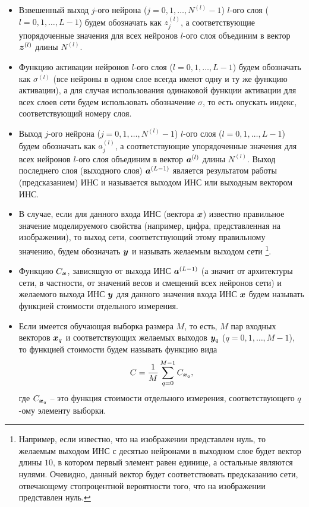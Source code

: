 \documentclass[a4paper,12pt,russian]{article} %
\begin{document}
\begin{itemize}
	\item
		Взвешенный выход $j$-ого нейрона  ($j=0, 1, \ldots, N^{(l)}-1$) $l$-ого слоя  ($l=0, 1, \ldots, L-1$) будем обозначать как $z_j^{(l)}$, а соответствующие упорядоченные значения для всех нейронов $l$-ого слоя объединим в вектор $\bm{z}^{(l)}$ длины $N^{(l)}$.
	\item
		Функцию активации нейронов $l$-ого слоя  ($l=0, 1, \ldots, L-1$) будем обозначать как $\sigma^{(l)}$ (все нейроны в одном слое всегда имеют одну и ту же функцию активации), а для случая использования одинаковой функции активации для всех слоев сети будем использовать обозначение $\sigma$, то есть опускать индекс, соответствующий номеру слоя.
	\item
		Выход $j$-ого нейрона  ($j=0, 1, \ldots, N^{(l)}-1$) $l$-ого слоя  ($l=0, 1, \ldots, L-1$) будем обозначать как $a_j^{(l)}$, а соответствующие упорядоченные значения для всех нейронов $l$-ого слоя объединим в вектор $\bm{a}^{(l)}$ длины $N^{(l)}$.	
		Выход последнего слоя (выходного слоя) $\bm{a}^{(L-1)}$ является результатом работы (предсказанием) ИНС и называется выходом ИНС или выходным вектором ИНС.
	\item
		В случае, если для данного входа ИНС (вектора $\bm{x}$) известно правильное значение моделируемого свойства (например, цифра, представленная на изображении), то выход сети, соответствующий этому правильному значению, будем обозначать $\bm{y}$ и называть желаемым выходом сети \footnote{
		Например, если известно, что на изображении представлен нуль, то желаемым выходом ИНС с десятью нейронами в выходном слое будет вектор длины $10$, в котором первый элемент равен единице, а остальные являются нулями. Очевидно, данный вектор будет соответствовать предсказанию сети, отвечающему стопроцентной вероятности того, что на изображении представлен нуль.
		}.
	\item
		Функцию $C_{\bm{x}}$, зависящую от выхода ИНС $\bm{a}^{(L-1)}$ (а значит от архитектуры сети, в частности, от значений весов и смещений всех нейронов сети) и желаемого выхода ИНС $\bm{y}$ для данного значения входа ИНС $\bm{x}$ будем называть функцией стоимости отдельного измерения.
	\item
		Если имеется обучающая выборка размера $M$, то есть, $M$ пар входных векторов $\bm{x}_q$ и соответствующих желаемых выходов $\bm{y}_q$ ($q=0, 1, \ldots, M-1$), то функцией стоимости будем называть функцию вида
		$$
			C = \frac{1}{M} \sum_{q=0}^{M-1} C_{\bm{x}_q},
		$$
		где $C_{\bm{x}_q}$ -- это функция стоимости отдельного измерения, соответствующего $q$-ому элементу выборки.
\end{itemize}
\end{document}
